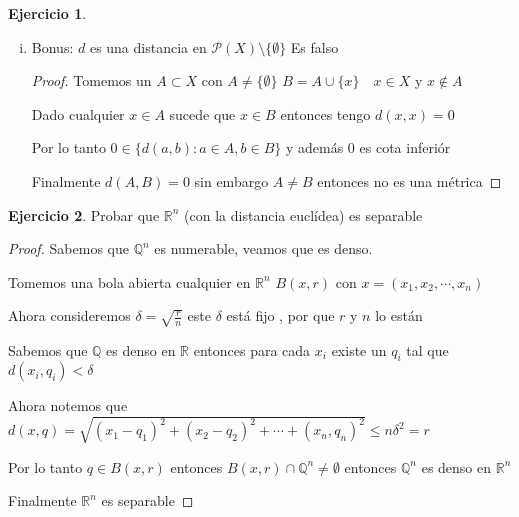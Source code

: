 \documentclass[11pt]{report}
\newcommand{\Q}{\mathbb{Q}}
\newcommand{\R}{\mathbb{R}}
\theoremstyle{definition}
\newtheorem{ej}{Ejercicio}
\begin{document}
\begin{ej}
\begin{enumerate}[i)]
\begin{proof}
      Otra forma sin usar propiedades de ínfimo:

      $d(a,b) \leq d(a,c) + d(c,b) \quad \forall a,b,c \in X$ en particular para $a \in A , b \in B, c \in C$

      pero entonces $\inf\{d(a,b): a \in A , b \in B\} \leq d(a,c) + d(c,b)$

      Luego $\inf\{d(a,b): a \in A , b \in B\} \leq \inf\{d(a,c): a\in A, c \in C\} + d(c,b)$

      De la misma forma:

      $\inf\{d(a,b): a \in A , b \in B\} \leq \inf\{d(a,c): a\in A, c \in C\} + \inf\{d(c,b): c\in C , b \in B\}$

      Entonces $d(A,B) \leq d(A,C) + d(C,B)$
      \end{proof}

	\item Bonus: $d$ es una distancia en $\mathcal{P}(X) \setminus \{\emptyset\}$ Es falso
      	\begin{proof}
	Tomemos un $A \subset X$ con $A \neq \{\emptyset\}$  $B = A \cup \{x\} \quad x \in X$ y $x \notin A$

	Dado cualquier $x \in A$ sucede que $x \in B$ entonces tengo $d(x,x) = 0$ 

	Por lo tanto $0 \in \{d(a,b): a\in A, b \in B\}$ y además 0 es cota inferiór

	Finalmente $d(A,B) = 0$ sin embargo $A \neq B$ entonces no es una métrica
	\end{proof}

  \end{enumerate}
\end{ej}

\begin{ej}
	Probar que $\R^n$ (con la distancia euclídea) es separable 
	\begin{proof}
		Sabemos que $\Q^n$ es numerable, veamos que es denso. 

		Tomemos una bola abierta cualquier en $\R^n$ $B(x,r)$ con $x = (x_1,x_2,\cdots, x_n)$

		Ahora consideremos $\delta= \sqrt{\frac{r}{n}}$ este $\delta$ está fijo , por que $r$ y $n$ lo están

		Sabemos que $\Q$ es denso en $\R$ entonces para cada $x_i$ existe un $q_i$ tal que $d(x_i,q_i) < \delta$ 

		Ahora notemos que $d(x,q) = \sqrt{(x_1 - q_1)^2 + (x_2 - q_2)^2 + \cdots + (x_n,q_n)^2} \leq n\delta^2 = r$

		Por lo tanto $q \in B(x,r)$ entonces $B(x,r) \cap \Q^n \neq \emptyset$ entonces $\Q^n$ es denso en $\R^n $

		Finalmente $\R^n$ es separable
	\end{proof}
\end{ej}
\end{document}
